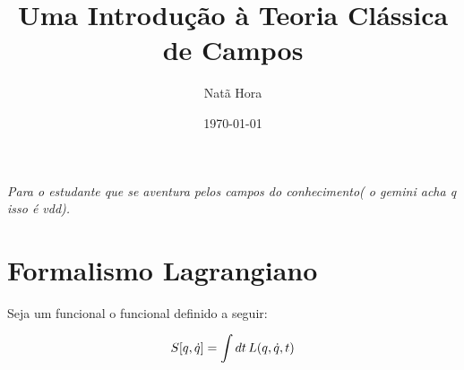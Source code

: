 \documentclass[12pt,a4paper]{book}
\title{\textbf{Uma Introdução à Teoria Clássica de Campos}}
\author{Natã Hora}
\date{\today}
\begin{document}
	\maketitle
	
	\thispagestyle{empty}
	\vspace*{\fill}
	\begin{flushright}
		\textit{Para o estudante que se aventura pelos campos do conhecimento( o gemini acha q isso é vdd).}
	\end{flushright}
	\vspace*{\fill}
	\cleardoublepage
	\tableofcontents
	
	\mainmatter
	\chapter{Formalismo Lagrangiano}
	Seja um funcional o funcional definido a seguir:
	
	\begin{equation}
		S\qty[q,\dot{q}]= \int dt \, L(q,\dot{q},t)
	\end{equation}
	
	
	
	
	
	
	
	
	
	
	
	
	
\end{document}

